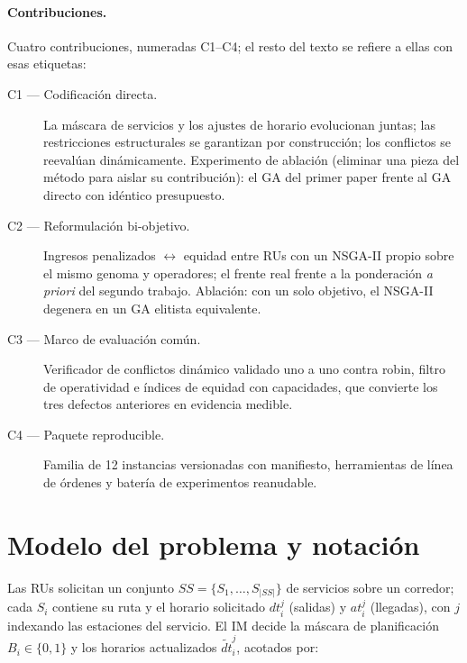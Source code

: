 \documentclass[11pt,a4paper]{article}
\newcommand{\ru}{\textup{RU}}
\begin{document}
\paragraph{Contribuciones.} Cuatro contribuciones, numeradas C1--C4; el
resto del texto se refiere a ellas con esas etiquetas:
\begin{description}
\item[C1 --- Codificación directa.] La máscara de servicios y los ajustes
de horario evolucionan juntas; las restricciones estructurales se garantizan
por construcción; los conflictos se reevalúan dinámicamente. Experimento de
ablación (eliminar una pieza del método para aislar su contribución): el GA
del primer paper frente al GA directo con idéntico presupuesto.
\item[C2 --- Reformulación bi-objetivo.] Ingresos penalizados
$\leftrightarrow$ equidad entre \ru{}s con un NSGA-II propio sobre el mismo
genoma y operadores; el frente real frente a la ponderación \emph{a priori}
del segundo trabajo. Ablación: con un solo objetivo, el NSGA-II degenera en
un GA elitista equivalente.
\item[C3 --- Marco de evaluación común.] Verificador de conflictos dinámico
validado uno a uno contra robin, filtro de operatividad e índices de equidad
con capacidades, que convierte los tres defectos anteriores en evidencia
medible.
\item[C4 --- Paquete reproducible.] Familia de 12 instancias versionadas con
manifiesto, herramientas de línea de órdenes y batería de experimentos
reanudable.
\end{description}

\section{Modelo del problema y notación}
\label{sec:modelo}

Las \ru{}s solicitan un conjunto $SS=\{S_1,\dots,S_{|SS|}\}$ de servicios
sobre un corredor; cada $S_i$ contiene su ruta y el horario solicitado
$dt_i^j$ (salidas) y $at_i^j$ (llegadas), con $j$ indexando las estaciones
del servicio. El IM decide la máscara de planificación $B_i \in \{0,1\}$ y
los horarios actualizados $\tilde{dt}_i^j$, acotados por:
\end{document}
